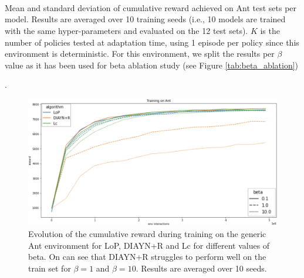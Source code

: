 \newpage

\begin{table}[h!]
\begin{adjustbox}{width=1.3\columnwidth,center}
 
\end{adjustbox}\\
\begin{adjustbox}{width=1.3\columnwidth,center}

\end{adjustbox}\\
\begin{adjustbox}{width=1.3\columnwidth,center}

\end{adjustbox}\\
\caption{Mean and standard deviation of cumulative reward achieved on Ant test sets per model. Results are averaged over 10 training seeds (i.e., 10 models are trained with the same hyper-parameters and evaluated on the 12 test sets). $K$ is the number of policies tested at adaptation time, using 1 episode per policy since this environment is deterministic. For this environment, we split the results per $\beta$ value as it has been used for beta ablation study (see Figure \ref{tab:beta_ablation})}
\end{table}
\label{table:ant_test_results}

\newpage

.
\vspace{4cm}

\begin{figure}[h!]
    \centering
    \includegraphics[width=1.\linewidth]{images/ant_beta.png}
    \caption{Evolution of the cumulative reward during training on the generic Ant environment for LoP, DIAYN+R and Lc for different values of beta. On can see that DIAYN+R struggles to perform well on the train set for $\beta=1$ and $\beta=10$. Results are averaged over 10 seeds.}
    \label{fig:ant_beta_train}
\end{figure}


